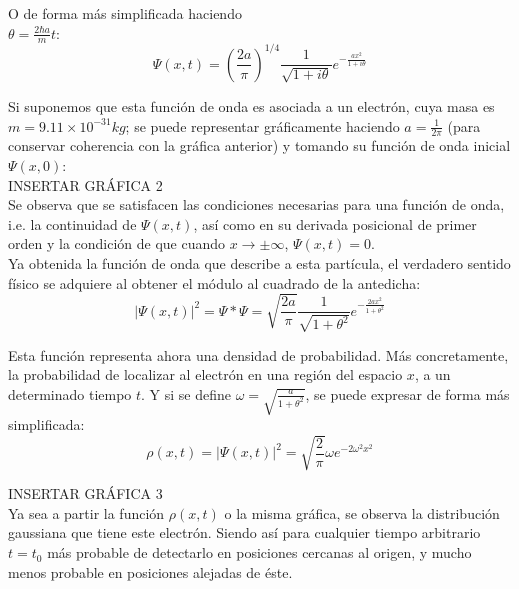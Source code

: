 O de forma más simplificada haciendo\\ $\theta=\frac{2\hbar a}{m}t$:
\begin{equation}
    \Psi(x,t) = \left( \frac{2a}{\pi} \right)^{1/4} \frac{1}{\sqrt{1+i\theta}} e^{-\frac{ax^2}{1+i\theta}}
\end{equation}

Si suponemos que esta función de onda es asociada a un electrón, cuya masa es $m=9.11\times10^{-31} kg$; se puede 
representar gráficamente haciendo $a=\frac{1}{2\pi}$ (para conservar coherencia con la gráfica anterior) 
y tomando su función de onda inicial $\Psi(x,0)$:\\

INSERTAR GRÁFICA 2 \\

Se observa que se satisfacen las condiciones necesarias para una función de onda, i.e. la continuidad de $\Psi(x,t)$, 
así como en su derivada posicional de primer orden y la condición de que cuando $x\rightarrow\pm\infty$, $\Psi(x,t)=0$.\\

Ya obtenida la función de onda que describe a esta partícula, el verdadero sentido físico se adquiere al obtener el 
módulo al cuadrado de la antedicha:
\begin{equation*}
    \lvert\Psi(x,t)\rvert^2 = \Psi*\Psi = \sqrt{\frac{2a}{\pi}} \frac{1}{\sqrt{1+\theta^2}} e^{-\frac{2ax^2}{1+\theta^2}}
\end{equation*}

Esta función representa ahora una densidad de probabilidad. Más concretamente, la probabilidad de localizar al electrón 
en una región del espacio $x$, a un determinado tiempo $t$. Y si se define $\omega=\sqrt{\frac{a}{1+\theta^2}}$, se puede 
expresar de forma más simplificada:
\begin{equation}
    \rho(x,t) = \lvert\Psi(x,t)\rvert^2 = \sqrt{\frac{2}{\pi}} \omega e^{-2\omega^2x^2}
\end{equation}

INSERTAR GRÁFICA 3 \\

Ya sea a partir la función $\rho(x,t)$ o la misma gráfica, se observa la distribución gaussiana que tiene este electrón. 
Siendo así para cualquier tiempo arbitrario $t=t_{0}$ más probable de detectarlo en posiciones cercanas al origen, y mucho 
menos probable en posiciones alejadas de éste.